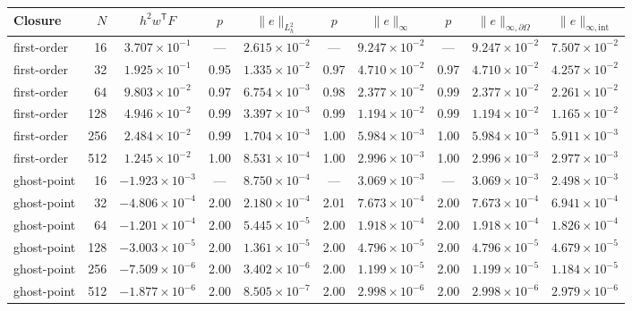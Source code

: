 \begin{tabular}{@{}lrcccccccc@{}}\toprule
Closure & $N$ & $h^2w^{\mathsf T}F$ & $p$ & $\|e\|_{L^2_h}$ & $p$ & $\|e\|_{\infty}$ & $p$ & $\|e\|_{\infty,\partial\Omega}$ & $\|e\|_{\infty,\mathrm{int}}$\\\midrule
first-order & 16 & $3.707\times10^{-1}$ & --- & $2.615\times10^{-2}$ & --- & $9.247\times10^{-2}$ & --- & $9.247\times10^{-2}$ & $7.507\times10^{-2}$\\
first-order & 32 & $1.925\times10^{-1}$ & 0.95 & $1.335\times10^{-2}$ & 0.97 & $4.710\times10^{-2}$ & 0.97 & $4.710\times10^{-2}$ & $4.257\times10^{-2}$\\
first-order & 64 & $9.803\times10^{-2}$ & 0.97 & $6.754\times10^{-3}$ & 0.98 & $2.377\times10^{-2}$ & 0.99 & $2.377\times10^{-2}$ & $2.261\times10^{-2}$\\
first-order & 128 & $4.946\times10^{-2}$ & 0.99 & $3.397\times10^{-3}$ & 0.99 & $1.194\times10^{-2}$ & 0.99 & $1.194\times10^{-2}$ & $1.165\times10^{-2}$\\
first-order & 256 & $2.484\times10^{-2}$ & 0.99 & $1.704\times10^{-3}$ & 1.00 & $5.984\times10^{-3}$ & 1.00 & $5.984\times10^{-3}$ & $5.911\times10^{-3}$\\
first-order & 512 & $1.245\times10^{-2}$ & 1.00 & $8.531\times10^{-4}$ & 1.00 & $2.996\times10^{-3}$ & 1.00 & $2.996\times10^{-3}$ & $2.977\times10^{-3}$\\
\midrule
ghost-point & 16 & $-1.923\times10^{-3}$ & --- & $8.750\times10^{-4}$ & --- & $3.069\times10^{-3}$ & --- & $3.069\times10^{-3}$ & $2.498\times10^{-3}$\\
ghost-point & 32 & $-4.806\times10^{-4}$ & 2.00 & $2.180\times10^{-4}$ & 2.01 & $7.673\times10^{-4}$ & 2.00 & $7.673\times10^{-4}$ & $6.941\times10^{-4}$\\
ghost-point & 64 & $-1.201\times10^{-4}$ & 2.00 & $5.445\times10^{-5}$ & 2.00 & $1.918\times10^{-4}$ & 2.00 & $1.918\times10^{-4}$ & $1.826\times10^{-4}$\\
ghost-point & 128 & $-3.003\times10^{-5}$ & 2.00 & $1.361\times10^{-5}$ & 2.00 & $4.796\times10^{-5}$ & 2.00 & $4.796\times10^{-5}$ & $4.679\times10^{-5}$\\
ghost-point & 256 & $-7.509\times10^{-6}$ & 2.00 & $3.402\times10^{-6}$ & 2.00 & $1.199\times10^{-5}$ & 2.00 & $1.199\times10^{-5}$ & $1.184\times10^{-5}$\\
ghost-point & 512 & $-1.877\times10^{-6}$ & 2.00 & $8.505\times10^{-7}$ & 2.00 & $2.998\times10^{-6}$ & 2.00 & $2.998\times10^{-6}$ & $2.979\times10^{-6}$\\
\bottomrule
\end{tabular}
